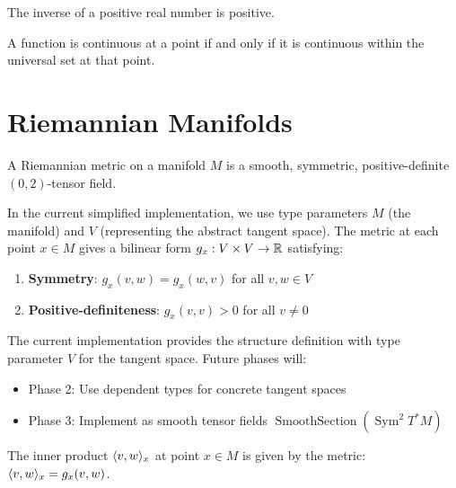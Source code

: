 \begin{lemma}
\label{lem:inv-pos}
\leanok
The inverse of a positive real number is positive.
\end{lemma}

\begin{lemma}
\label{lem:continuous-at-iff}
\leanok
{}
A function is continuous at a point if and only if it is continuous within the universal set at that point.
\end{lemma}

\chapter{Riemannian Manifolds}
\label{chap:riemannian}

\begin{definition}
\label{def:riemannian-metric}
A Riemannian metric on a manifold $M$ is a smooth, symmetric, positive-definite $(0,2)$-tensor field.

In the current simplified implementation, we use type parameters $M$ (the manifold) and $V$ (representing the abstract tangent space). The metric at each point $x \in M$ gives a bilinear form $g_x : V \times V \to \mathbb{R}$ satisfying:
\begin{enumerate}
\item \textbf{Symmetry}: $g_x(v, w) = g_x(w, v)$ for all $v, w \in V$
\item \textbf{Positive-definiteness}: $g_x(v, v) > 0$ for all $v \neq 0$
\end{enumerate}
\end{definition}

\begin{remark}
The current implementation provides the structure definition with type parameter $V$ for the tangent space. Future phases will:
\begin{itemize}
\item Phase 2: Use dependent types for concrete tangent spaces
\item Phase 3: Implement as smooth tensor fields $\operatorname{SmoothSection}(\operatorname{Sym}^2 T^*M)$
\end{itemize}
\end{remark}

\begin{definition}
\label{def:inner-product}
The inner product $\langle v, w \rangle_x$ at point $x \in M$ is given by the metric: $\langle v, w \rangle_x = g_x(v, w)$.
\end{definition}

